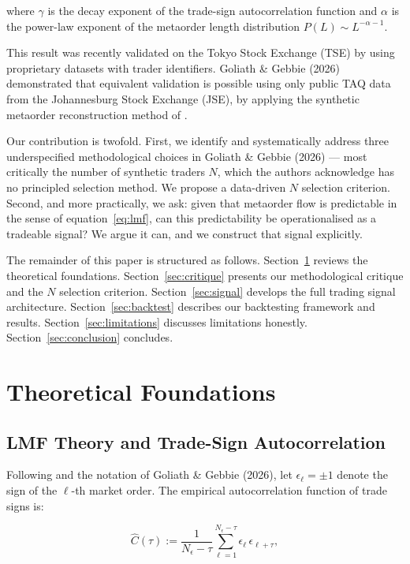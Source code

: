 \documentclass[12pt,a4paper]{article}
\begin{document}
\noindent where $\gamma$ is the decay exponent of the trade-sign autocorrelation
function and $\alpha$ is the power-law exponent of the metaorder length
distribution $P(L) \sim L^{-\alpha-1}$.

This result was recently validated on the Tokyo Stock Exchange (TSE) by
\citet{sato2023} using proprietary datasets with trader identifiers. Goliath \&
Gebbie (2026) demonstrated that equivalent validation is possible using only
public TAQ data from the Johannesburg Stock Exchange (JSE), by applying the
synthetic metaorder reconstruction method of \citet{maitrier2025}.

Our contribution is twofold. First, we identify and systematically address
three underspecified methodological choices in Goliath \& Gebbie (2026) ---
most critically the number of synthetic traders $N$, which the authors
acknowledge has no principled selection method. We propose a data-driven
$N$ selection criterion. Second, and more practically, we ask: given that
metaorder flow is predictable in the sense of equation~\eqref{eq:lmf}, can
this predictability be operationalised as a tradeable signal? We argue it can,
and we construct that signal explicitly.

The remainder of this paper is structured as follows. Section~\ref{sec:theory}
reviews the theoretical foundations. Section~\ref{sec:critique} presents our
methodological critique and the $N$ selection criterion.
Section~\ref{sec:signal} develops the full trading signal architecture.
Section~\ref{sec:backtest} describes our backtesting framework and results.
Section~\ref{sec:limitations} discusses limitations honestly.
Section~\ref{sec:conclusion} concludes.

\section{Theoretical Foundations}
\label{sec:theory}

\subsection{LMF Theory and Trade-Sign Autocorrelation}

Following \citet{lillo2005} and the notation of Goliath \& Gebbie (2026), let
$\epsilon_\ell = \pm 1$ denote the sign of the $\ell$-th market order. The
empirical autocorrelation function of trade signs is:

\begin{equation}
  \hat{C}(\tau) := \frac{1}{N_\epsilon - \tau}
    \sum_{\ell=1}^{N_\epsilon - \tau} \epsilon_\ell \, \epsilon_{\ell+\tau},
  \label{eq:acf}
\end{equation}
\end{document}

